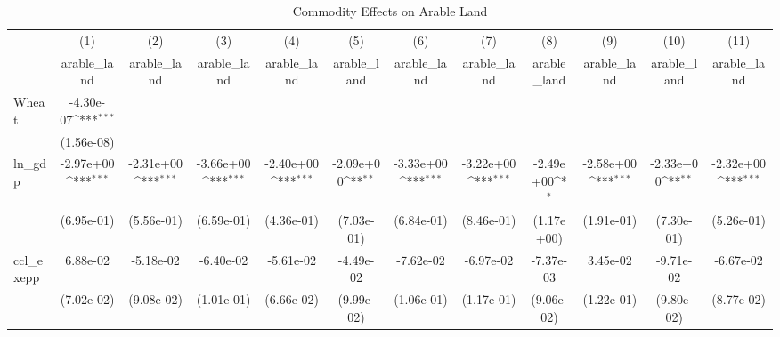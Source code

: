 \begin{table}[htbp]\centering
\def\sym#1{\ifmmode^{#1}\else\(^{#1}\)\fi}
\caption{Commodity Effects on Arable Land}
\begin{tabular}{l*{11}{c}}
\hline\hline
            &\multicolumn{1}{c}{(1)}&\multicolumn{1}{c}{(2)}&\multicolumn{1}{c}{(3)}&\multicolumn{1}{c}{(4)}&\multicolumn{1}{c}{(5)}&\multicolumn{1}{c}{(6)}&\multicolumn{1}{c}{(7)}&\multicolumn{1}{c}{(8)}&\multicolumn{1}{c}{(9)}&\multicolumn{1}{c}{(10)}&\multicolumn{1}{c}{(11)}\\
            &\multicolumn{1}{c}{arable\_land}&\multicolumn{1}{c}{arable\_land}&\multicolumn{1}{c}{arable\_land}&\multicolumn{1}{c}{arable\_land}&\multicolumn{1}{c}{arable\_land}&\multicolumn{1}{c}{arable\_land}&\multicolumn{1}{c}{arable\_land}&\multicolumn{1}{c}{arable\_land}&\multicolumn{1}{c}{arable\_land}&\multicolumn{1}{c}{arable\_land}&\multicolumn{1}{c}{arable\_land}\\
\hline
Wheat       &   -4.30e-07\sym{***}&                     &                     &                     &                     &                     &                     &                     &                     &                     &                     \\
            &  (1.56e-08)         &                     &                     &                     &                     &                     &                     &                     &                     &                     &                     \\
[1em]
ln\_gdp      &   -2.97e+00\sym{***}&   -2.31e+00\sym{***}&   -3.66e+00\sym{***}&   -2.40e+00\sym{***}&   -2.09e+00\sym{**} &   -3.33e+00\sym{***}&   -3.22e+00\sym{***}&   -2.49e+00\sym{*}  &   -2.58e+00\sym{***}&   -2.33e+00\sym{**} &   -2.32e+00\sym{***}\\
            &  (6.95e-01)         &  (5.56e-01)         &  (6.59e-01)         &  (4.36e-01)         &  (7.03e-01)         &  (6.84e-01)         &  (8.46e-01)         &  (1.17e+00)         &  (1.91e-01)         &  (7.30e-01)         &  (5.26e-01)         \\
[1em]
ccl\_exepp   &    6.88e-02         &   -5.18e-02         &   -6.40e-02         &   -5.61e-02         &   -4.49e-02         &   -7.62e-02         &   -6.97e-02         &   -7.37e-03         &    3.45e-02         &   -9.71e-02         &   -6.67e-02         \\
            &  (7.02e-02)         &  (9.08e-02)         &  (1.01e-01)         &  (6.66e-02)         &  (9.99e-02)         &  (1.06e-01)         &  (1.17e-01)         &  (9.06e-02)         &  (1.22e-01)         &  (9.80e-02)         &  (8.77e-02)         \\

\end{tabular}
\end{table}
